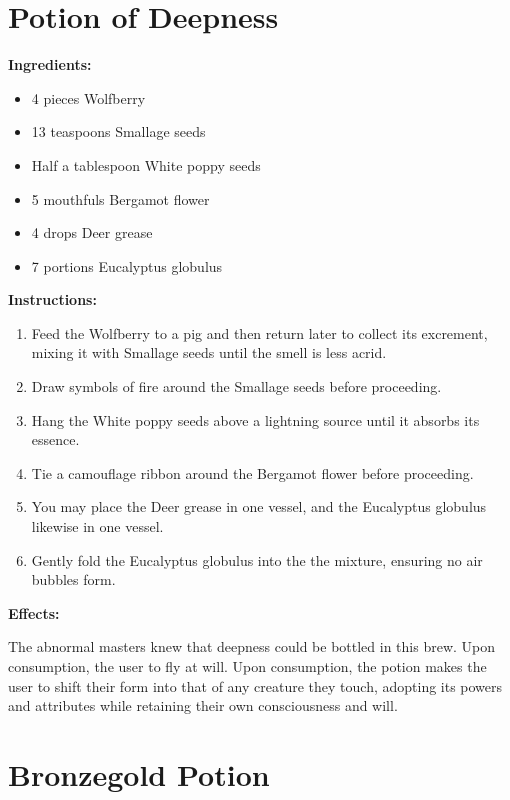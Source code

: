 \documentclass{article}
\begin{document}
\newpage
\section*{Potion of Deepness}

\textbf{Ingredients:}

\begin{itemize}
  \item 4 pieces Wolfberry
  \item 13 teaspoons Smallage seeds
  \item Half a tablespoon White poppy seeds
  \item 5 mouthfuls Bergamot flower
  \item 4 drops Deer grease
  \item 7 portions Eucalyptus globulus
\end{itemize}

\textbf{Instructions:}

\begin{enumerate}
  \item Feed the Wolfberry to a pig and then return later to collect its excrement, mixing it with Smallage seeds until the smell is less acrid.
  \item Draw symbols of fire around the Smallage seeds before proceeding.
  \item Hang the White poppy seeds above a lightning source until it absorbs its essence.
  \item Tie a camouflage ribbon around the Bergamot flower before proceeding.
  \item You may place the Deer grease in one vessel, and the Eucalyptus globulus likewise in one vessel.
  \item Gently fold the Eucalyptus globulus into the the mixture, ensuring no air bubbles form.
\end{enumerate}

\textbf{Effects:}

The abnormal masters knew that deepness could be bottled in this brew. Upon consumption, the user to fly at will. Upon consumption, the potion makes the user to shift their form into that of any creature they touch, adopting its powers and attributes while retaining their own consciousness and will.

\newpage
\section*{Bronzegold Potion}
\end{document}
